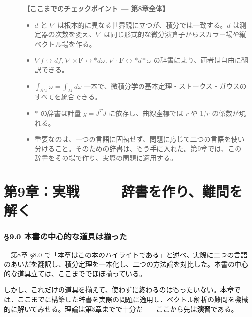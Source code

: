 \documentclass[a4paper,12pt,openany]{book}
\begin{document}
\begin{quote}
\textbf{【ここまでのチェックポイント — 第8章全体】}

\begin{itemize}
\item
  \(d\) と \(\nabla\)
  は根本的に異なる世界観に立つが、積分では一致する。\(d\)
  は測定器の次数を変え、\(\nabla\)
  は同じ形式的な微分演算子からスカラー場や縦ベクトル場を作る。
\item
  \(\nabla f \leftrightarrow df\),
  \(\nabla\times\mathbf{F} \leftrightarrow \ast d\omega\),
  \(\nabla\cdot\mathbf{F} \leftrightarrow \ast d\ast\omega\)
  の辞書により、両者は自由に翻訳できる。
\item
  \(\int_{\partial M}\omega = \int_M d\omega\)
  一本で、微積分学の基本定理・ストークス・ガウスのすべてを統合できる。
\item
  \(\ast\) の辞書は計量 \(g = J^T J\) に依存し、曲線座標では \(r\) や
  \(1/r\) の係数が現れる。
\item
  重要なのは、一つの言語に固執せず、問題に応じて二つの言語を使い分けること。そのための辞書は、もう手に入れた。第9章では、この辞書をその場で作り、実際の問題に適用する。
\end{itemize}
\end{quote}

\newpage

\hypertarget{ux7b2c9ux7ae0ux5b9fux6226-ux8f9eux66f8ux3092ux4f5cux308aux96e3ux554fux3092ux89e3ux304f}{%
\chapter{第9章：実戦 ——
辞書を作り、難問を解く}\label{ux7b2c9ux7ae0ux5b9fux6226-ux8f9eux66f8ux3092ux4f5cux308aux96e3ux554fux3092ux89e3ux304f}}

\hypertarget{ux672cux66f8ux306eux4e2dux5fc3ux7684ux306aux9053ux5177ux306fux63c3ux3063ux305f}{%
\subsection{§9.0
本書の中心的な道具は揃った}\label{ux672cux66f8ux306eux4e2dux5fc3ux7684ux306aux9053ux5177ux306fux63c3ux3063ux305f}}

　第8章 §8.0
で「本章はこの本のハイライトである」と述べ、実際に二つの言語のあいだを翻訳し、積分定理を一本化し、二つの方法論を対比した。本書の中心的な道具立ては、ここまででほぼ揃っている。

しかし、これだけの道具を揃えて、使わずに終わるのはもったいない。本章では、ここまでに構築した辞書を実際の問題に適用し、ベクトル解析の難問を機械的に解いてみせる。理論は第8章までで十分だ——ここから先は\textbf{演習}である。
\end{document}

